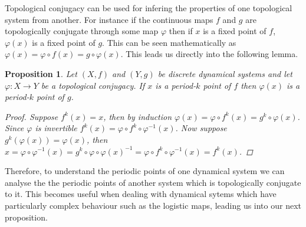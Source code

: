 \documentclass[11pt,a4paper,oneside]{memoir}
\theoremstyle{plain}
\newtheorem{prop}[thm]{Proposition}
\theoremstyle{definition}
\begin{document}
\begin{center}
\end{center}

Topological conjugacy can be used for infering the properties of one topological system from another. For instance if the continuous maps $f$ and $g$ are topologically conjugate through some map $\varphi$ then if $x$ is a fixed point of $f$, $\varphi(x)$ is a fixed point of $g$. This can be seen mathematically as $\varphi(x) = \varphi \circ f(x) = g \circ \varphi(x)$. This leads us directly into the following lemma.

\begin{prop} \label{prop:conjugacy-preserves-periodic-points}
    Let $(X, f)$ and $(Y, g)$ be discrete dynamical systems and let $\varphi: X \to Y$ be a topological conjugacy. If $x$ is a period-$k$ point of $f$ then $\varphi(x)$ is a period-$k$ point of $g$.
    \begin{proof}
        Suppose $f^k(x) = x$, then by induction $\varphi(x) = \varphi \circ f^k(x) = g^k \circ \varphi (x)$. Since $\varphi$ is invertible $f^k(x) = \varphi \circ f^k \circ \varphi^{-1}(x)$. Now suppose $g^k(\varphi(x)) = \varphi(x)$, then $x = \varphi \circ \varphi^{-1}(x) = g^k \circ \varphi \circ \varphi(x)^{-1} = \varphi \circ f^k \circ \varphi^{-1}(x) = f^k(x)$.
    \end{proof}
\end{prop}

Therefore, to understand the periodic points of one dynamical system we can analyse the the periodic points of another system which is topologically conjugate to it. This becomes useful when dealing with dynamical sytems which have particularly complex behaviour such as the logistic maps, leading us into our next proposition.
\end{document}
